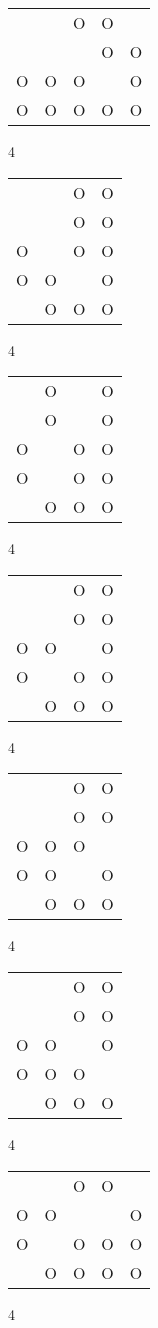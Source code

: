 \begin{tabular}{|m{0.2cm}m{0.2cm}m{0.2cm}m{0.2cm}m{0.2cm}|}\hline
 & &O&O& \\
 & & &O&O\\
O&O&O& &O\\
O&O&O&O&O\\
\hline\end{tabular}4
\begin{tabular}{|m{0.2cm}m{0.2cm}m{0.2cm}m{0.2cm}|}\hline
 & &O&O\\
 & &O&O\\
O& &O&O\\
O&O& &O\\
 &O&O&O\\
\hline\end{tabular}4
\begin{tabular}{|m{0.2cm}m{0.2cm}m{0.2cm}m{0.2cm}|}\hline
 &O& &O\\
 &O& &O\\
O& &O&O\\
O& &O&O\\
 &O&O&O\\
\hline\end{tabular}4
\begin{tabular}{|m{0.2cm}m{0.2cm}m{0.2cm}m{0.2cm}|}\hline
 & &O&O\\
 & &O&O\\
O&O& &O\\
O& &O&O\\
 &O&O&O\\
\hline\end{tabular}4
\begin{tabular}{|m{0.2cm}m{0.2cm}m{0.2cm}m{0.2cm}|}\hline
 & &O&O\\
 & &O&O\\
O&O&O& \\
O&O& &O\\
 &O&O&O\\
\hline\end{tabular}4
\begin{tabular}{|m{0.2cm}m{0.2cm}m{0.2cm}m{0.2cm}|}\hline
 & &O&O\\
 & &O&O\\
O&O& &O\\
O&O&O& \\
 &O&O&O\\
\hline\end{tabular}4
\begin{tabular}{|m{0.2cm}m{0.2cm}m{0.2cm}m{0.2cm}m{0.2cm}|}\hline
 & &O&O& \\
O&O& & &O\\
O& &O&O&O\\
 &O&O&O&O\\
\hline\end{tabular}4
